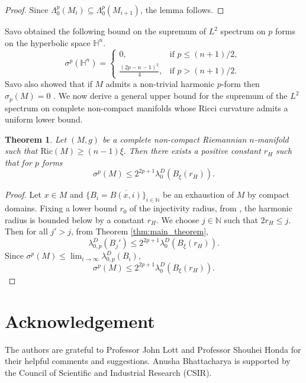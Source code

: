 \documentclass[10 pt, reqno]{amsart}
\newtheorem{theorem}{Theorem}[section]
\begin{document}
\begin{proof}
    Since $\Lambda^p_0(M_i)\subseteq \Lambda^p_0(M_{i+1})$, the lemma follows.
\end{proof}

Savo \cite{savo09}  obtained the following bound on the supremum of $L^2$ spectrum on $p$ forms on the hyperbolic space $\mathbb{H}^n$.
\begin{equation*}
\sigma^p(\mathbb{H}^n)=
\begin{cases}
0, & \text{if $p\le (n+1)/2$, }\\
\frac{(2p-n-1)^2}{4}, & \text{if $p>(n+1)/2$}.
\end{cases}
\end{equation*}
Savo also showed that if  $M$ admits a non-trivial harmonic $p$-form then $\sigma_p(M)=0$ \cite{savo09}. We now derive a general upper bound for the supremum of the $L^2$ spectrum on complete non-compact manifolds whose Ricci curvature admits a uniform lower bound.
 
\begin{theorem}
   
   Let $(M,g)$ be a complete non-compact Riemannian $n$-manifold such that $\mathrm{Ric}(M)\ge (n-1)\xi.$ Then there exists a positive constant $r_H$ such that for $p$ forms
   \[\sigma^p(M)\le 2^{2p+1} \lambda_0^D(B_\xi(r_H)).\]   
   \end{theorem}
  \begin{proof}  
  

 Let $x\in M$ and $\{B_i=\overline{B\left(x,i\right)}\}_{i\in\mathbb{N}}$ be an exhaustion of $M$ by compact domains. Fixing a lower bound $r_0$ of the injectivity radius, from \cite{Hebey}, the harmonic radius is bounded below by a constant $r_H$.  We choose $j\in\mathbb{N}$ such that  $2r_H\le j.$      Then for all $j'>j$, from Theorem \ref{thm:main_theorem}, 
\[\lambda_{0,p}^D(B_j')\le 2^{2p+1} \lambda_0^D(B_\xi(r_H)).\]      
     Since $\sigma^p(M)\le \lim_{i\rightarrow \infty}\lambda_{0,p}^D(B_i)$, \[\sigma^p(M)\le 2^{2p+1} \lambda_0^D(B_\xi(r_H)).\]

  \end{proof}      





\section*{Acknowledgement}
The authors are grateful to Professor John Lott and Professor Shouhei Honda for their helpful comments and suggestions. Anusha Bhattacharya is supported by the Council of Scientific and Industrial Research (CSIR).
\printbibliography
\end{document}
